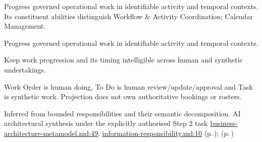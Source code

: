 Progress governed operational work in identifiable activity and temporal contexts. Its constituent abilities distinguish Workflow \& Activity Coordination; Calendar Management.



Progress governed operational work in identifiable activity and temporal contexts.



Keep work progression and its timing intelligible across human and synthetic undertakings.



Work Order is human doing, To Do is human review/\allowbreak{}update/\allowbreak{}approval and Task is synthetic work. Projection does not own authoritative bookings or rosters.


Inferred from bounded responsibilities and their semantic decomposition. AI architectural synthesis under the explicitly authorised Step 2 task \hyperref[evidence:4bac85accd34ce0b]{business-architecture-metamodel.md:49}; \hyperref[evidence:be61392fefb4bb10]{information-responsibility.md:10}
 (p.\,\pageref{cap:bec-reviewed-workflow-activity-coordination});  (p.\,\pageref{cap:bec-calendar-management})
